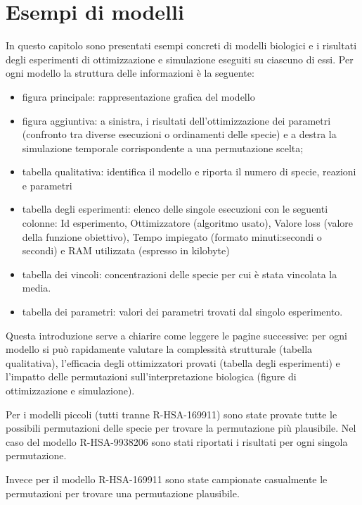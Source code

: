 \chapter{Esempi di modelli}

In questo capitolo sono presentati esempi concreti di modelli biologici e i risultati
 degli esperimenti di ottimizzazione e simulazione eseguiti su ciascuno di essi.
 Per ogni modello la struttura delle informazioni è la seguente:
 \begin{itemize}
    \item figura principale: rappresentazione grafica del modello
    \item figura aggiuntiva: a sinistra, i risultati dell'ottimizzazione dei parametri
   (confronto tra diverse esecuzioni o ordinamenti delle specie) e a destra
   la simulazione temporale corrispondente a una permutazione scelta;
   \item tabella qualitativa: identifica il modello e riporta il numero di specie, reazioni e parametri
   \item tabella degli esperimenti: elenco delle singole esecuzioni con le seguenti colonne:
     Id esperimento, Ottimizzatore (algoritmo usato), Valore loss (valore della funzione obiettivo), Tempo impiegato (formato minuti:secondi o secondi) e
     RAM utilizzata (espresso in kilobyte)
    \item tabella dei vincoli: concentrazioni delle specie per cui è stata vincolata la media.
    \item tabella dei parametri: valori dei parametri trovati dal singolo esperimento.
 \end{itemize}


 Questa introduzione serve a chiarire come leggere le pagine successive: per ogni modello
 si può rapidamente valutare la complessità strutturale (tabella qualitativa), l'efficacia
 degli ottimizzatori provati (tabella degli esperimenti) e l'impatto delle permutazioni
 sull'interpretazione biologica (figure di ottimizzazione e simulazione).

 Per i modelli piccoli (tutti tranne R-HSA-169911) sono state provate tutte le possibili permutazioni delle specie
 per trovare la permutazione più plausibile. Nel caso del modello R-HSA-9938206 sono stati riportati i risultati per ogni singola permutazione.

 Invece per il modello R-HSA-169911 sono state campionate casualmente le permutazioni per trovare una permutazione plausibile.


